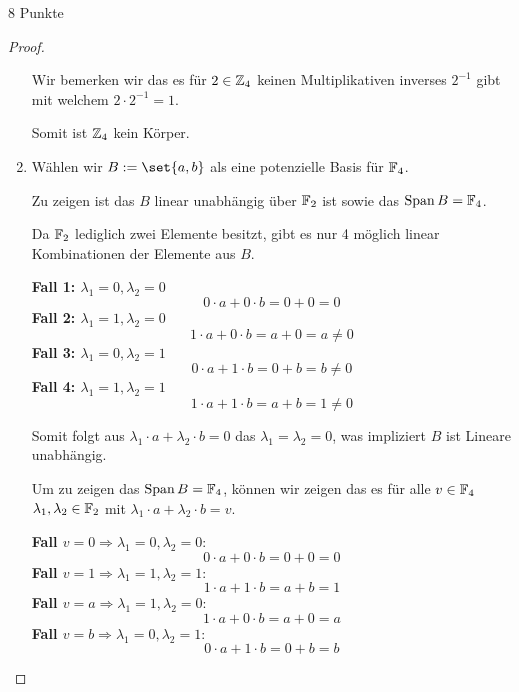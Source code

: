 \documentclass{problemset}
\begin{document}
\begin{problem}{8 Punkte}
\begin{proof}
\begin{enumerate}
              Wir bemerken wir das es für $2 \in \mathbb{Z}_4$ keinen
              Multiplikativen inverses $2^{-1}$ gibt mit welchem $2 \cdot
              2^{-1} = 1$.

              Somit ist $\mathbb{Z}_4$ kein Körper. \checkmark
        \item Wählen wir $B := \set{a, b}$ als eine potenzielle Basis für
              $\mathbb{F}_4$.

              Zu zeigen ist das $B$ linear unabhängig über $\mathbb{F}_2$ ist
              sowie das $\operatorname{Span} B = \mathbb{F}_4$.

              Da $\mathbb{F}_2$ lediglich zwei Elemente besitzt, gibt es nur 4
              möglich linear Kombinationen der Elemente aus $B$.

              \textbf{Fall 1: $\lambda_1 = 0, \lambda_2 = 0$}
              \[
                  0 \cdot a + 0 \cdot b = 0 + 0 = 0
              \]
              \textbf{Fall 2: $\lambda_1 = 1, \lambda_2 = 0$}
              \[
                  1 \cdot a + 0 \cdot b = a + 0 = a \neq 0
              \]
              \textbf{Fall 3: $\lambda_1 = 0, \lambda_2 = 1$}
              \[
                  0 \cdot a + 1 \cdot b = 0 + b = b \neq 0
              \]
              \textbf{Fall 4: $\lambda_1 = 1, \lambda_2 = 1$}
              \[
                  1 \cdot a + 1 \cdot b = a + b = 1 \neq 0
              \]

              Somit folgt aus $\lambda_1 \cdot a + \lambda_2 \cdot b = 0$ das
              $\lambda_1 = \lambda_2 = 0$, was impliziert $B$ ist Lineare
              unabhängig. \checkmark

              Um zu zeigen das $\operatorname{Span} B = \mathbb{F}_4$, können
              wir zeigen das es für alle $v \in \mathbb{F}_4$ $\lambda_1,
              \lambda_2 \in \mathbb{F}_2$ mit $\lambda_1 \cdot a + \lambda_2
              \cdot b = v$.

              \textbf{Fall $v = 0 \Rightarrow \lambda_1 = 0, \lambda_2 = 0$}:
              \[
                  0 \cdot a + 0 \cdot b = 0 + 0 = 0
              \]
              \textbf{Fall $v = 1 \Rightarrow \lambda_1 = 1, \lambda_2 = 1$}:
              \[
                  1 \cdot a + 1 \cdot b = a + b = 1
              \]
              \textbf{Fall $v = a \Rightarrow \lambda_1 = 1, \lambda_2 = 0$}:
              \[
                  1 \cdot a + 0 \cdot b = a + 0 = a
              \]
              \textbf{Fall $v = b \Rightarrow \lambda_1 = 0, \lambda_2 = 1$}:
              \[
                  0 \cdot a + 1 \cdot b = 0 + b = b
              \]


\end{enumerate}
\end{proof}
\end{problem}
\end{document}
